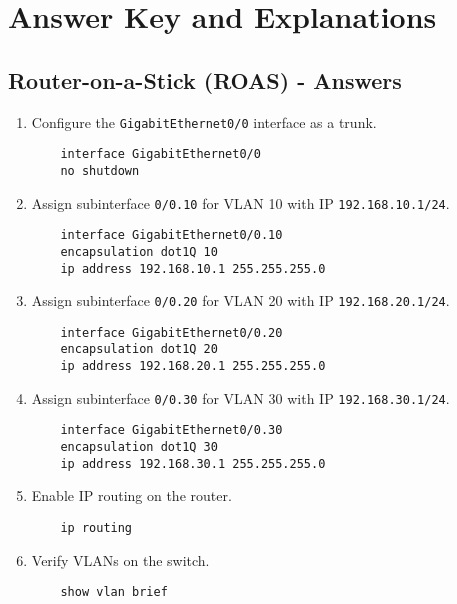 \documentclass[a4paper]{book}
\begin{document}
\part{Answer Key and Explanations}


\chapter{Router-on-a-Stick (ROAS) - Answers}

\begin{enumerate}
    \item Configure the \texttt{GigabitEthernet0/0} interface as a trunk.
    \begin{lstlisting}
    interface GigabitEthernet0/0
    no shutdown
    \end{lstlisting}
    
    \item Assign subinterface \texttt{0/0.10} for VLAN 10 with IP \texttt{192.168.10.1/24}.
    \begin{lstlisting}
    interface GigabitEthernet0/0.10
    encapsulation dot1Q 10
    ip address 192.168.10.1 255.255.255.0
    \end{lstlisting}

    \item Assign subinterface \texttt{0/0.20} for VLAN 20 with IP \texttt{192.168.20.1/24}.
    \begin{lstlisting}
    interface GigabitEthernet0/0.20
    encapsulation dot1Q 20
    ip address 192.168.20.1 255.255.255.0
    \end{lstlisting}

    \item Assign subinterface \texttt{0/0.30} for VLAN 30 with IP \texttt{192.168.30.1/24}.
    \begin{lstlisting}
    interface GigabitEthernet0/0.30
    encapsulation dot1Q 30
    ip address 192.168.30.1 255.255.255.0
    \end{lstlisting}

    \item Enable IP routing on the router.
    \begin{lstlisting}
    ip routing
    \end{lstlisting}

    \item Verify VLANs on the switch.
    \begin{lstlisting}
    show vlan brief
    \end{lstlisting}


\end{enumerate}
\end{document}

